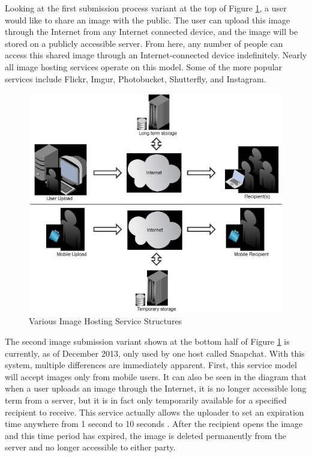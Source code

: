 Looking at the first submission process variant at the top of Figure \ref{imageshareprocess}, a user would like to share an image with the public. The user can upload this image through the Internet from any Internet connected device, and the image will be stored on a publicly accessible server. From here, any number of people can access this shared image through an Internet-connected device indefinitely. Nearly all image hosting services operate on this model. Some of the more popular services include Flickr, Imgur, Photobucket, Shutterfly, and Instagram.

\begin{figure}[htbp]
\centering
\includegraphics[width=4.5in]{imageshareprocess}
\caption{Various Image Hosting Service Structures}
\label{imageshareprocess}
\end{figure}

The second image submission variant shown at the bottom half of Figure \ref{imageshareprocess} is currently, as of December 2013, only used by one host called Snapchat. With this system, multiple differences are immediately apparent. First, this service model will accept images only from mobile users. It can also be seen in the diagram that when a user uploads an image through the Internet, it is no longer accessible long term from a server, but it is in fact only temporarily available for a specified recipient to receive. This service actually allows the uploader to set an expiration time anywhere from 1 second to 10 seconds \cite{snap:support}. After the recipient opens the image and this time period has expired, the image is deleted permanently from the server and no longer accessible to either party.

